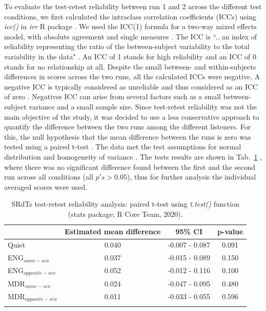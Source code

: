 \documentclass[a4paper, twoside]{templates/ociamthesis}
\begin{document}
To evaluate the test-retest reliability between run 1 and 2 across the different test conditions, we first calculated the intraclass correlation coefficients (ICCs) using \textit{icc()} in \textit{irr} R package \autocite{Stats_TestRetest_irr}. We used the ICC(1) formula for a two-way mixed effects model, with absolute agreement and single measures \autocite[cf.][]{Koo2016}. The ICC is ``.. an index of reliability representing the ratio of the between-subject variability to the total variability in the data" \autocite[p.~458]{Leensen2013}. An ICC of 1 stands for high reliability and an ICC of 0 stands for no relationship at all. Despite the small between- and within-subjects differences in scores across the two runs, all the calculated ICCs were negative. A negative ICC is typically considered as unreliable and thus considered as an ICC of zero \autocites[e.g.,][]{Qin2019,Matheson2019}. Negatives ICC can arise from several factors such as a small between-subject variance and a small sample size. Since test-retest reliability was not the main objective of the study, it was decided to use a less conservative approach to quantify the difference between the two runs among the different listeners. For this, the null hypothesis that the mean difference between the runs is zero was tested using a paired t-test \autocite[\textit{t.test()}, stats package;][]{RCoreTeam}. The data met the test assumptions for normal distribution \autocite[Shapiro-Wilk test;][]{Stats_ShapiroWilkRPackage} and homogeneity of variance \autocite[Levene's test;][]{Car_LevenTestRPackage}. The tests results are shown in Tab.~\ref{tab:Exp2_TestRetest} , where there was no significant difference found between the first and the second run across all conditions (all \(p's > 0.05\)), thus for further analysis the individual averaged scores were used.\\

\begin{table}[ht]
\center
\caption{\label{tab:Exp2_TestRetest}{SRdTs test-retest reliability analysis: paired t-test using \textit{t.test()} function (stats package; R Core Team, 2020).}}
\renewcommand{\arraystretch}{2}
\begin{tabular}{l c c c}
\hline\hline
 &Estimated mean difference &95\% CI&p-value\\ 
\hline
Quiet & 0.040 & -0.007 -  0.087 & 0.091\\
ENG$_{same-sex}$ &  0.037 & -0.015 - 0.089 & 0.150\\
ENG$_{opposite-sex}$ & 0.052 & -0.012 - 0.116 & 0.100 \\
MDR$_{same-sex}$ & 0.024 & -0.047 - 0.095 & 0.480 \\
MDR$_{opposite-sex}$ & 0.011 & -0.033 - 0.055 & 0.596 \\
\hline\hline
\\
\end{tabular}
\label{tab:Exp2_TestRetest}
\end{table} 
\end{document}
